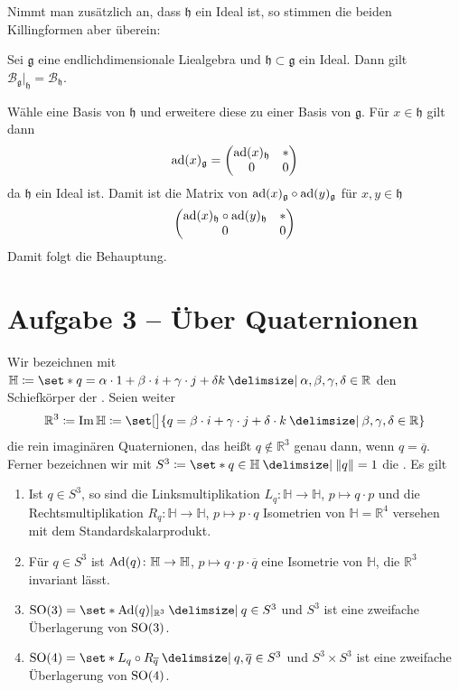 Nimmt man zusätzlich an, dass $\mathfrak{h}$ ein Ideal ist, so stimmen die beiden Killingformen aber überein:
\begin{lemma}
	Sei $\mathfrak{g}$ eine endlichdimensionale Liealgebra und $\mathfrak{h} \subset \mathfrak{g}$ ein Ideal.
	Dann gilt $\mathcal{B}_\mathfrak{g}\big|_{\mathfrak{h}} = \mathcal{B}_\mathfrak{h}$.
\end{lemma}
\begin{beweis}
	Wähle eine Basis von $\mathfrak{h}$ und erweitere diese zu einer Basis von $\mathfrak{g}$.
	Für $x \in \mathfrak{h}$ gilt dann
	\[
		\operatorname{ad}(x)_\mathfrak{g} = \begin{pmatrix}
			\operatorname{ad}(x)_\mathfrak{h} & * \\ 0 & 0
		\end{pmatrix}
	\]
	da $\mathfrak{h}$ ein Ideal ist.
	Damit ist die Matrix von $\operatorname{ad}(x)_\mathfrak{g} \circ \operatorname{ad}(y)_\mathfrak{g}$ für $x,y \in \mathfrak{h}$
	\[
		\begin{pmatrix}
			\operatorname{ad}(x)_\mathfrak{h} \circ \operatorname{ad}(y)_\mathfrak{h} & * \\ 0 & 0
		\end{pmatrix}
	\]
	Damit folgt die Behauptung.
\end{beweis}

\section{Aufgabe 3 -- Über Quaternionen} %
\label{sec:aufg3}
Wir bezeichnen mit $\mathbb{H} \coloneqq \set*{q = \alpha \cdot 1 + \beta \cdot i + \gamma \cdot j + \delta k \given \alpha, \beta, \gamma, \delta \in \mathbb{R}}$ den Schiefkörper der .
Seien weiter
\[
	\mathbb{R}^3 \coloneqq \Im \mathbb{H} \coloneqq \set[\big]{q = \beta \cdot i + \gamma \cdot j + \delta \cdot k \given \beta,\gamma,\delta \in \mathbb{R}}
\]
die rein imaginären Quaternionen, das heißt $q \notin \mathbb{R}^3$ genau dann, wenn $q = \overline{q}$.
Ferner bezeichnen wir mit $S^3 \coloneqq \set*{q \in \mathbb{H} \given \norm*{q}=1}$ die .
Es gilt
\begin{enumerate}[(1)]
	\item Ist $q \in S^3$, so sind die Linksmultiplikation $L_q \colon \mathbb{H} \to \mathbb{H}$, $p \mapsto q \cdot p$ und die Rechtsmultiplikation $R_q \colon \mathbb{H} \to \mathbb{H}$, $p \mapsto p \cdot q$ Isometrien von $\mathbb{H}=\mathbb{R}^4$ versehen mit dem Standardskalarprodukt.
	\item Für $q \in S^3$ ist $\operatorname{Ad}(q) \colon \mathbb{H} \to \mathbb{H}$, $p \mapsto q \cdot p \cdot \overline{q}$ eine Isometrie von $\mathbb{H}$, die $\mathbb{R}^3$ invariant lässt.
	\item $\SO(3) = \set*{\Ad(q)|_{\mathbb{R}^3} \given q \in S^3}$ und $S^3$ ist eine zweifache Überlagerung von $\operatorname{SO}(3)$.
	\item $\SO(4) = \set*{L_q \circ R_{\overline{q}} \given q,\overline{q} \in S^3}$ und $S^3 \times S^3$ ist eine zweifache Überlagerung von $\operatorname{SO}(4)$.
\end{enumerate}
\begin{beweis}
\end{beweis}

